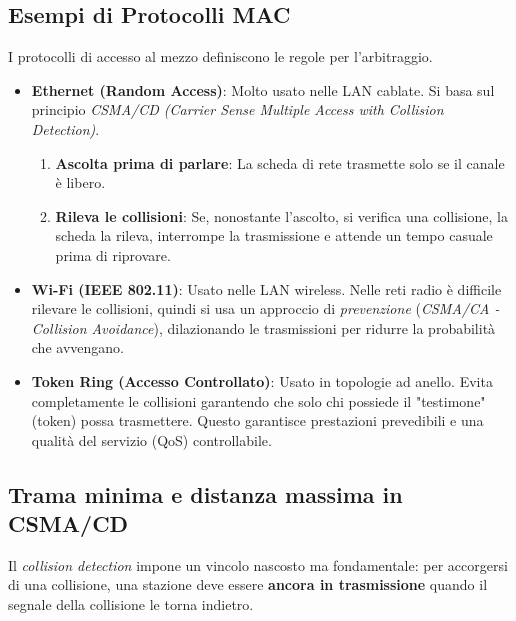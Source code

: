 \subsection{Esempi di Protocolli MAC}
I protocolli di accesso al mezzo definiscono le regole per l'arbitraggio.
\begin{itemize}
    \item \textbf{Ethernet (Random Access)}: Molto usato nelle LAN cablate. Si basa sul principio \textit{CSMA/CD (Carrier Sense Multiple Access with Collision Detection)}.
    \begin{enumerate}
        \item \textbf{Ascolta prima di parlare}: La scheda di rete trasmette solo se il canale è libero.
        \item \textbf{Rileva le collisioni}: Se, nonostante l'ascolto, si verifica una collisione, la scheda la rileva, interrompe la trasmissione e attende un tempo casuale prima di riprovare.
    \end{enumerate}
    \item \textbf{Wi-Fi (IEEE 802.11)}: Usato nelle LAN wireless. Nelle reti radio è difficile rilevare le collisioni, quindi si usa un approccio di \textit{prevenzione} (\textit{CSMA/CA - Collision Avoidance}), dilazionando le trasmissioni per ridurre la probabilità che avvengano.
    \item \textbf{Token Ring (Accesso Controllato)}: Usato in topologie ad anello. Evita completamente le collisioni garantendo che solo chi possiede il "testimone" (token) possa trasmettere. Questo garantisce prestazioni prevedibili e una qualità del servizio (QoS) controllabile.
\end{itemize}

\subsection{Trama minima e distanza massima in CSMA/CD}
Il \textit{collision detection} impone un vincolo nascosto ma fondamentale: per
accorgersi di una collisione, una stazione deve essere \textbf{ancora in
trasmissione} quando il segnale della collisione le torna indietro.

